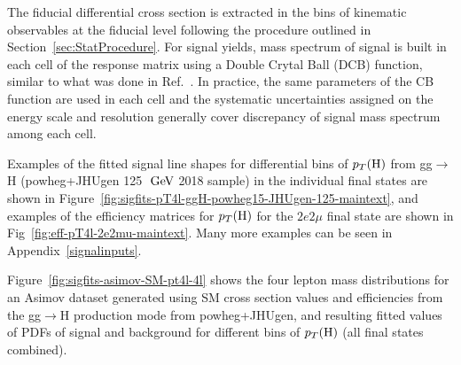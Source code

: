 The fiducial differential cross section is extracted in the bins of kinematic observables at the fiducial level following the procedure outlined in Section~\ref{sec:StatProcedure}. 
For signal yields, mass spectrum of signal is built in each cell of the response matrix using a Double Crytal Ball (DCB) function, similar to what was done in Ref.~\cite{Chatrchyan:2013mxa}.
In practice, the same parameters of the CB function are used in each cell and the systematic uncertainties assigned on the energy scale and resolution generally cover discrepancy of signal mass spectrum among each cell.
\par
Examples of the fitted signal line shapes for differential bins of $p_T({\rm H})$ from gg$\rightarrow$H ({\sc powheg+JHUgen} 125 $\hbox{$\;\hbox{\rm GeV}$}$ 2018 sample) in the individual
final states are shown in Figure~\ref{fig:sigfits-pT4l-ggH-powheg15-JHUgen-125-maintext}, and examples of the efficiency matrices for $p_T({\rm H})$ for the
$2e2\mu$ final state are shown in Fig~\ref{fig:eff-pT4l-2e2mu-maintext}. Many more examples can be seen in Appendix~\ref{signalinputs}.

Figure~\ref{fig:sigfits-asimov-SM-pt4l-4l} shows the four lepton mass distributions for an Asimov dataset generated using SM cross section values and efficiencies
from the gg$\rightarrow$H production mode from {\sc powheg+JHUgen}, and resulting fitted values of PDFs of signal and background for different bins of $p_T(\mathrm{H})$ (all final states combined).

